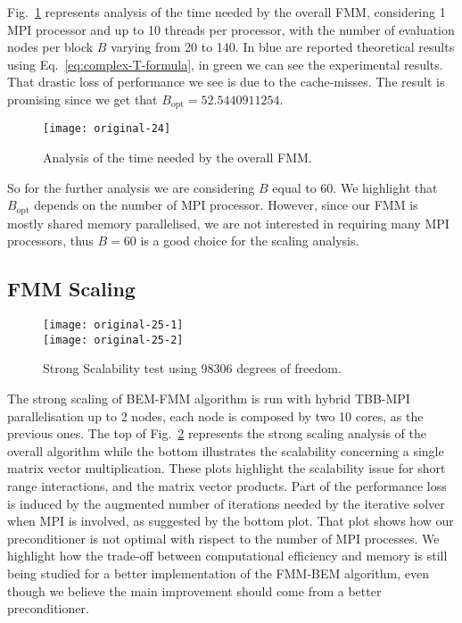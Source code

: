 Fig.~\ref{fig:original-24} represents analysis of the time needed by the overall FMM, considering 1 MPI processor and up to 10 threads per processor, with the number of evaluation nodes per block $B$ varying from 20 to 140. In blue are reported theoretical results using Eq.~\eqref{eq:complex-T-formula}, in green we can see the experimental results. That drastic loss of performance we see is due to the cache-misses. The result is promising since we get that $B_{\text{opt}}=52.5440911254$.

\begin{figure}[!htp]
\begin{center}
    \texttt{[image: original-24]}    %
    \caption{Analysis of the time needed by the overall FMM.} 
    \label{fig:original-24}
\end{center}
\end{figure}

So for the further analysis we are considering $B$ equal to 60. We highlight that $B_{\text{opt}}$ depends on the number of MPI processor. However, since our FMM is mostly shared memory parallelised, we are not interested in requiring many MPI processors, thus $B = 60$ is a good choice for the scaling analysis.

\subsection{FMM Scaling}
\label{sub:fmm_scaling}

\begin{figure}[!htp]
\begin{center}
    \texttt{[image: original-25-1]} \\
    \texttt{[image: original-25-2]} %
    \caption{Strong Scalability test using 98306 degrees of freedom.} 
    \label{fig:original-25}
\end{center}
\end{figure}

The strong scaling of BEM-FMM algorithm is run
with hybrid TBB-MPI parallelisation up to 2 nodes, each node is composed by two 10 cores, as the previous ones. The top of Fig.~\ref{fig:original-25} represents the strong scaling analysis of the overall algorithm while the bottom illustrates the scalability concerning a single matrix vector multiplication. These plots highlight the scalability issue for short range interactions, and the matrix vector products. Part of the performance loss is induced by the augmented number of iterations needed by the iterative solver when MPI is involved, as suggested by the bottom plot. That plot shows how our
preconditioner is not optimal with rispect to the number of MPI processes. We highlight how the trade-off between computational efficiency and memory is still being studied for a better implementation of the FMM-BEM algorithm, even though we believe the main improvement should come from a better preconditioner.








